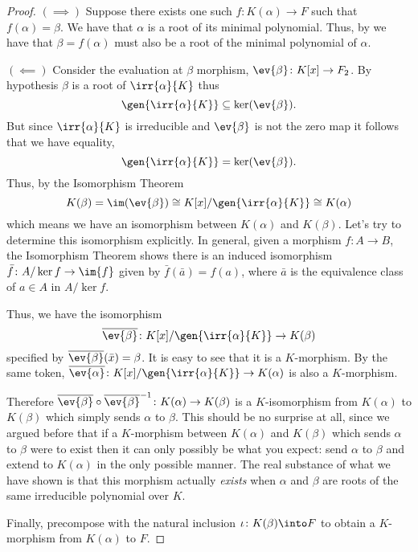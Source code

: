 \documentclass[12pt,oneside]{book}
\begin{document}
\begin{proof}
	\( (\implies) \) Suppose there exists one such \( f \colon K(\alpha) \to F \) such
	that \( f(\alpha) = \beta \). We have that \( \alpha \) is a root of its minimal
	polynomial. Thus, by  we have that \( \beta =
	f(\alpha) \) must also be a root of the minimal polynomial of \( \alpha \).

	\( (\impliedby) \) Consider the evaluation at \( \beta \) morphism, \( \ev{\beta} \colon
	K[x] \to F_2 \). By hypothesis \( \beta \) is a root of \( \irr{\alpha}{K} \) thus
	\begin{equation*}
		\gen{\irr{\alpha}{K}} \subseteq \ker(\ev{\beta}).
	\end{equation*}
	But since \( \irr{\alpha}{K} \) is irreducible and \( \ev{\beta} \) is not the zero map it
	follows that we have equality,
	\begin{equation*}
		\gen{\irr{\alpha}{K}} = \ker(\ev{\beta}).
	\end{equation*}
	Thus, by the Isomorphism Theorem
	\begin{equation*}
		K(\beta) = \im(\ev{\beta}) \cong K[x]/\gen{\irr{\alpha}{K}} \cong K(\alpha)
	\end{equation*}
	which means we have an isomorphism between \( K(\alpha) \) and \( K(\beta) \). Let's try
	to determine this isomorphism explicitly. In general, given a morphism	\( f \colon A
	\to B \), the Isomorphism Theorem shows there is an induced isomorphism \( \bar{f}
	\colon A/\ker{f} \to \im{f} \) given by \( \bar{f}(\bar{a}) = f(a) \), where \( \bar{a}
	\) is the equivalence class of \( a \in A \) in \( A / \ker{f} \).
	
	Thus, we have the isomorphism 
	\begin{equation*}
		\overline{\ev{\beta}} \colon K[x]/\gen{\irr{\alpha}{K}} \to K(\beta)
	\end{equation*}
	specified by \( \overline{\ev{\beta}}(\bar{x}) = \beta \). It is easy to see that it is
	a \( K \)-morphism. By the same token, \( \overline{\ev{\alpha}} \colon
	K[x]/\gen{\irr{\alpha}{K}} \to K(\alpha) \) is also a \( K \)-morphism.

	Therefore \( \overline{\ev{\beta}} \circ \overline{\ev{\beta}}^{-1} \colon K(\alpha) \to
	K(\beta) \) is a \( K \)-isomorphism from \( K(\alpha) \) to \( K(\beta) \) which simply
	sends \( \alpha \) to \( \beta \). This should be no surprise at all, since we argued
	before that if a \( K \)-morphism between \( K(\alpha) \) and \( K(\beta) \) which sends
	\( \alpha \) to \( \beta \) were to exist then it can only possibly be what you expect:
	send \( \alpha \) to \( \beta \) and extend to \( K(\alpha) \) in the only possible
	manner. The real substance of what we have shown is that this morphism actually
	\emph{exists} when \( \alpha \) and \( \beta \) are roots of the same irreducible
	polynomial over \( K \).

	Finally, precompose with the natural inclusion	\( \iota \colon K(\beta) \into F \) to
	obtain a \( K \)-morphism from \( K(\alpha) \) to \( F \).
\end{proof}
\end{document}
